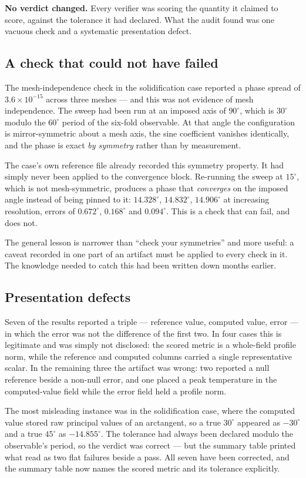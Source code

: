 \documentclass[11pt,a4paper]{article}
\begin{document}
\textbf{No verdict changed.} Every verifier was scoring the quantity it claimed
to score, against the tolerance it had declared. What the audit found was one
vacuous check and a systematic presentation defect.

\subsection{A check that could not have failed}
The mesh-independence check in the solidification case reported a phase spread of
$3.6\times10^{-15}$ across three meshes --- and this was not evidence of mesh
independence. The sweep had been run at an imposed axis of $90^{\circ}$, which is
$30^{\circ}$ modulo the $60^{\circ}$ period of the six-fold observable. At that
angle the configuration is mirror-symmetric about a mesh axis, the sine
coefficient vanishes identically, and the phase is exact \emph{by symmetry}
rather than by measurement.

The case's own reference file already recorded this symmetry property. It had
simply never been applied to the convergence block. Re-running the sweep at
$15^{\circ}$, which is not mesh-symmetric, produces a phase that
\emph{converges} on the imposed angle instead of being pinned to it:
$14.328^{\circ}$, $14.832^{\circ}$, $14.906^{\circ}$ at increasing resolution,
errors of $0.672^{\circ}$, $0.168^{\circ}$ and $0.094^{\circ}$. This is a check
that can fail, and does not.

The general lesson is narrower than ``check your symmetries'' and more useful: a
caveat recorded in one part of an artifact must be applied to every check in it.
The knowledge needed to catch this had been written down months earlier.

\subsection{Presentation defects}
Seven of the results reported a triple --- reference value, computed value, error
--- in which the error was not the difference of the first two. In four cases
this is legitimate and was simply not disclosed: the scored metric is a whole-field
profile norm, while the reference and computed columns carried a single
representative scalar. In the remaining three the artifact was wrong: two
reported a null reference beside a non-null error, and one placed a peak
temperature in the computed-value field while the error field held a profile
norm.

The most misleading instance was in the solidification case, where the computed
value stored raw principal values of an arctangent, so a true $30^{\circ}$
appeared as $-30^{\circ}$ and a true $45^{\circ}$ as $-14.855^{\circ}$. The
tolerance had always been declared modulo the observable's period, so the verdict
was correct --- but the summary table printed what read as two flat failures
beside a pass. All seven have been corrected, and the summary table now names the
scored metric and its tolerance explicitly.
\end{document}
